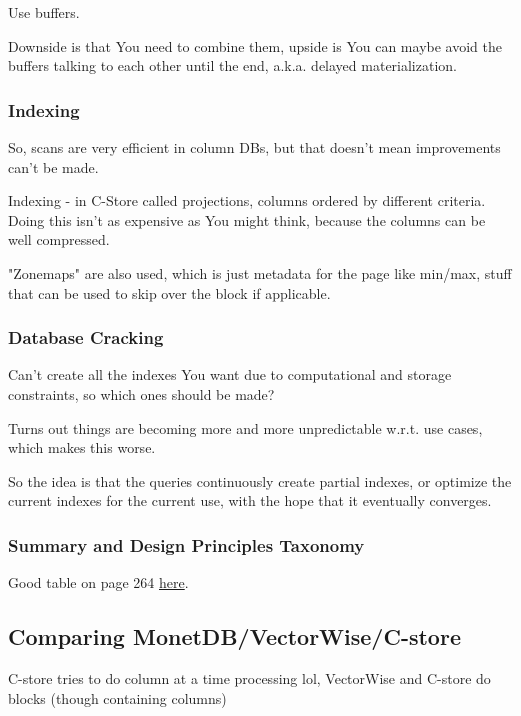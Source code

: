 \documentclass{article}
\begin{document}
			Use buffers.
			
			Downside is that You need to combine them, upside is You can maybe avoid the buffers talking to each other until the end, a.k.a. delayed materialization.
			
		\subsubsection{Indexing}
			
			So, scans are very efficient in column DBs, but that doesn't mean improvements can't be made.
			
			Indexing - in C-Store called projections, columns ordered by different criteria. Doing this isn't as expensive as You might think, because the columns can be well compressed.
		
			"Zonemaps" are also used, which is just metadata for the page like min/max, stuff that can be used to skip over the block if applicable.
			
		\subsubsection{Database Cracking}
		
			Can't create all the indexes You want due to computational and storage constraints, so which ones should be made?
			
			Turns out things are becoming more and more unpredictable w.r.t. use cases, which makes this worse.
			
			So the idea is that the queries continuously create partial indexes, or optimize the current indexes for the current use, with the hope that it eventually converges.
			
		\subsubsection{Summary and Design Principles Taxonomy}
		
			Good table on page 264 \href{https://stratos.seas.harvard.edu/files/stratos/files/columnstoresfntdbs.pdf}{here}.
	
	\subsection{Comparing MonetDB/VectorWise/C-store}
	
		C-store tries to do column at a time processing lol, VectorWise and C-store do blocks (though containing columns)
			
\end{document}
